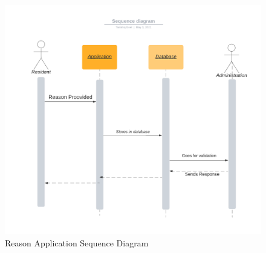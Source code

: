 \documentclass[eng]{FCEFyN-class}
\begin{document}
\begin{figure}[!htb]
 \includegraphics[scale=0.35]{filesFCEFyN-class/drone_sd.png} 
 \caption{Reason Application Sequence Diagram} \label{fig-2}
 \FloatBarrier
\end{figure}
\end{document}
